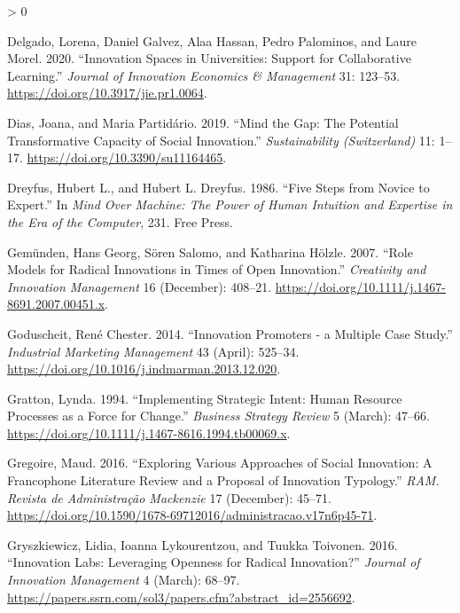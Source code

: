 \documentclass[AMA,STIX1COL,APA,STIX2COL]{WileyNJD-v2}
\newlength{\cslhangindent}
\newenvironment{CSLReferences}[2] %
 {%
  \setlength{\parindent}{0pt}
  \ifodd #1 \everypar{\setlength{\hangindent}{\cslhangindent}}\ignorespaces\fi
  \ifnum #2 > 0
  \setlength{\parskip}{#2\baselineskip}
  \fi
 }%
 {}
\begin{document}
\begin{CSLReferences}{1}{0}
\leavevmode\hypertarget{ref-Delgado2020}{}%
Delgado, Lorena, Daniel Galvez, Alaa Hassan, Pedro Palominos, and Laure
Morel. 2020. {``Innovation Spaces in Universities: Support for
Collaborative Learning.''} \emph{Journal of Innovation Economics \&
Management} 31: 123--53. \url{https://doi.org/10.3917/jie.pr1.0064}.

\leavevmode\hypertarget{ref-Dias2019}{}%
Dias, Joana, and Maria Partidário. 2019. {``Mind the Gap: The Potential
Transformative Capacity of Social Innovation.''} \emph{Sustainability
(Switzerland)} 11: 1--17. \url{https://doi.org/10.3390/su11164465}.

\leavevmode\hypertarget{ref-Dreyfus1986}{}%
Dreyfus, Hubert L., and Hubert L. Dreyfus. 1986. {``Five Steps from
Novice to Expert.''} In \emph{Mind Over Machine: The Power of Human
Intuition and Expertise in the Era of the Computer}, 231. Free Press.

\leavevmode\hypertarget{ref-Gemunden2007}{}%
Gemünden, Hans Georg, Sören Salomo, and Katharina Hölzle. 2007. {``Role
Models for Radical Innovations in Times of Open Innovation.''}
\emph{Creativity and Innovation Management} 16 (December): 408--21.
\url{https://doi.org/10.1111/j.1467-8691.2007.00451.x}.

\leavevmode\hypertarget{ref-Goduscheit2014}{}%
Goduscheit, René Chester. 2014. {``Innovation Promoters - a Multiple
Case Study.''} \emph{Industrial Marketing Management} 43 (April):
525--34. \url{https://doi.org/10.1016/j.indmarman.2013.12.020}.

\leavevmode\hypertarget{ref-Gratton1994}{}%
Gratton, Lynda. 1994. {``Implementing Strategic Intent: Human Resource
Processes as a Force for Change.''} \emph{Business Strategy Review} 5
(March): 47--66.
\url{https://doi.org/10.1111/j.1467-8616.1994.tb00069.x}.

\leavevmode\hypertarget{ref-Gregoire2016}{}%
Gregoire, Maud. 2016. {``Exploring Various Approaches of Social
Innovation: A Francophone Literature Review and a Proposal of Innovation
Typology.''} \emph{RAM. Revista de Administração Mackenzie} 17
(December): 45--71.
\url{https://doi.org/10.1590/1678-69712016/administracao.v17n6p45-71}.

\leavevmode\hypertarget{ref-Gryszkiewicz2016}{}%
Gryszkiewicz, Lidia, Ioanna Lykourentzou, and Tuukka Toivonen. 2016.
{``Innovation Labs: Leveraging Openness for Radical Innovation?''}
\emph{Journal of Innovation Management} 4 (March): 68--97.
\url{https://papers.ssrn.com/sol3/papers.cfm?abstract_id=2556692}.


\end{CSLReferences}
\end{document}
